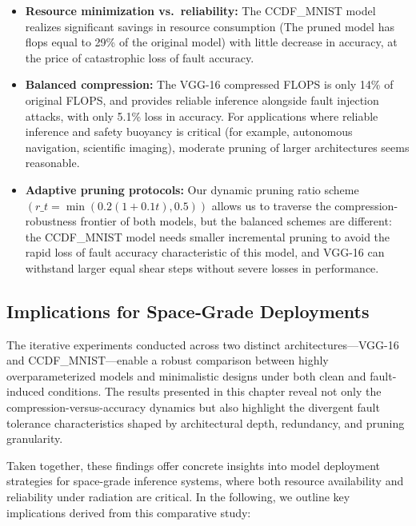 \begin{itemize}
  \item\textbf{Resource minimization vs.\ reliability:} The CCDF\_MNIST model realizes significant savings in resource consumption (The pruned model has \gls{flops} equal to 29\% of the original model) with little decrease in accuracy, at the price of catastrophic loss of fault accuracy.
  \item\textbf{Balanced compression:} The VGG-16 compressed FLOPS is only 14\% of original FLOPS, and provides reliable inference alongside fault injection attacks, with only 5.1\% loss in accuracy. For applications where reliable inference and safety buoyancy is critical (for example, autonomous navigation, scientific imaging), moderate pruning of larger architectures seems reasonable.
  \item\textbf{Adaptive pruning protocols:} Our dynamic pruning ratio scheme $(r\_t = \min(0.2(1+0.1t),0.5))$ allows us to traverse the compression-robustness frontier of both models, but the balanced schemes are different: the CCDF\_MNIST model needs smaller incremental pruning to avoid the rapid loss of fault accuracy characteristic of this model, and VGG-16 can withstand larger equal shear steps without severe losses in performance.

\end{itemize} 




\subsection{Implications for Space‐Grade Deployments}

The iterative experiments conducted across two distinct architectures—VGG-16 and CCDF\_MNIST—enable a robust comparison between highly overparameterized models and minimalistic designs under both clean and fault-induced conditions. The results presented in this chapter reveal not only the compression-versus-accuracy dynamics but also highlight the divergent fault tolerance characteristics shaped by architectural depth, redundancy, and pruning granularity.

Taken together, these findings offer concrete insights into model deployment strategies for space-grade inference systems, where both resource availability and reliability under radiation are critical. In the following, we outline key implications derived from this comparative study:







